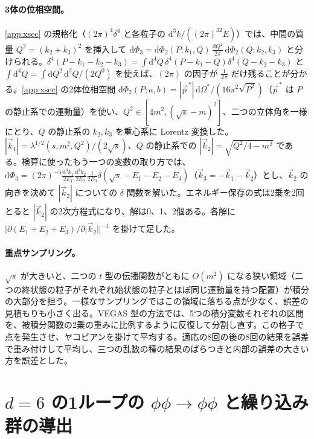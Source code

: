 \documentclass[a4paper,10pt]{ltjsarticle}
\newcommand{\dd}{\mathrm{d}}
\begin{document}
\paragraph{3体の位相空間。}\ref{app:xsec} の規格化（$(2\pi)^4\delta^4$ と各粒子の $\dd^3k/((2\pi)^32E)$）では、中間の質量 $Q^2=(k_2+k_3)^2$ を挿入して $\dd\Phi_3=\dd\Phi_2(P;k_1,Q)\,\frac{\dd Q^2}{2\pi}\,\dd\Phi_2(Q;k_2,k_3)$ と分けられる。$\delta^4(P-k_1-k_2-k_3)=\int\dd^4Q\,\delta^4(P-k_1-Q)\delta^4(Q-k_2-k_3)$ と $\int\dd^4Q=\int\dd Q^2\,\dd^3Q/(2Q^0)$ を使えば、$(2\pi)$ の因子が $\frac{1}{2\pi}$ だけ残ることが分かる。\ref{app:xsec} の2体位相空間 $\dd\Phi_2(P;a,b)=|\vec p^{\,*}|\,\dd\Omega^*/(16\pi^2\sqrt{P^2})$（$\vec p^{\,*}$ は $P$ の静止系での運動量）を使い、$Q^2\in[4m^2,(\sqrt s-m)^2]$、二つの立体角を一様にとり、$Q$ の静止系の $k_2,k_3$ を重心系に Lorentz 変換した。$|\vec k_1|=\lambda^{1/2}(s,m^2,Q^2)/(2\sqrt s)$、$Q$ の静止系での $|\vec k_2|=\sqrt{Q^2/4-m^2}$ である。検算に使ったもう一つの変数の取り方では、$\dd\Phi_3=(2\pi)^{-5}\frac{\dd^3k_1}{2E_1}\frac{\dd^3k_2}{2E_2}\frac{1}{2E_3}\delta(\sqrt s-E_1-E_2-E_3)$（$\vec k_3=-\vec k_1-\vec k_2$）とし、$\vec k_2$ の向きを決めて $|\vec k_2|$ についての $\delta$ 関数を解いた。エネルギー保存の式は2乗を2回とると $|\vec k_2|$ の2次方程式になり、解は0、1、2個ある。各解に $|\partial(E_1+E_2+E_3)/\partial|\vec k_2||^{-1}$ を掛けて足した。

\paragraph{重点サンプリング。}$\sqrt s$ が大きいと、二つの $t$ 型の伝播関数がともに $O(m^2)$ になる狭い領域（二つの終状態の粒子がそれぞれ始状態の粒子とほぼ同じ運動量を持つ配置）が積分の大部分を担う。一様なサンプリングではこの領域に落ちる点が少なく、誤差の見積もりも小さく出る。VEGAS 型の方法では、5つの積分変数それぞれの区間を、被積分関数の2乗の重みに比例するように反復して分割し直す。この格子で点を発生させ、ヤコビアンを掛けて平均する。適応の8回の後の8回の結果を誤差で重み付けして平均し、三つの乱数の種の結果のばらつきと内部の誤差の大きい方を誤差とした。

\section{$d=6$ の1ループの $\phi\phi\to\phi\phi$ と繰り込み群の導出}\label{app:scat6}
\end{document}

